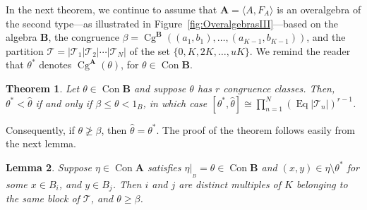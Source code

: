 \documentclass{au}
\numberwithin{equation}{section}
\theoremstyle{plain}
\newtheorem{theorem}{Theorem}[section]
\newtheorem{lemma}[theorem]{Lemma}
\theoremstyle{definition}
\newcommand{\<}{\ensuremath{\langle}}
\renewcommand{\>}{\ensuremath{\rangle}}
\newcommand{\bA}{\ensuremath{\mathbf{A}}}
\newcommand{\bB}{\ensuremath{\mathbf{B}}}
\newcommand{\sT}{\ensuremath{\mathscr{T}}}
\DeclareMathOperator{\Eq}{Eq}
\DeclareMathOperator{\Cg}{Cg}
\DeclareMathOperator{\Con}{Con}
\renewcommand{\leq}{\ensuremath{\leqslant}}
\renewcommand{\geq}{\ensuremath{\geqslant}}
\newcommand{\resB}{\ensuremath{|_{_B}}}
\begin{document}
In the next theorem, we continue to assume that $\bA = \< A, F_A\>$ is an
overalgebra of the second type---as illustrated in
Figure~\ref{fig:OveralgebrasIII}---based on the algebra $\bB$, the congruence
$\beta = \Cg^{\bB}((a_1, b_1), \dots, (a_{K-1},b_{K-1}))$, and the partition
$\sT = |\sT_1|\sT_2| \cdots |\sT_N|$ of the set  $\{0, K, 2K, \dots, uK\}$.
We remind the reader that $\theta^*$ denotes $\Cg^\bA(\theta)$, for
$\theta\in \Con \bB$.

\begin{theorem}
\label{thm3}
Let $\theta\in \Con \bB$ and suppose $\theta$ has $r$ congruence classes.
Then, $\theta^* < \widehat{\theta}$ if and only if
$\beta\leq \theta < 1_B$, in which case $[\theta^*, \widehat{\theta}] \cong
\prod_{n=1}^N(\Eq|\sT_n|)^{r-1}$.
\end{theorem}
Consequently, if $\theta \ngeq \beta$, then $\widehat{\theta} = \theta^*$.
The proof of the theorem follows easily from the next lemma.
\begin{lemma}
\label{lem3.1}
Suppose $\eta \in \Con\bA$ satisfies $\eta\resB = \theta \in \Con \bB$ and $(x,y) \in \eta \setminus \theta^*$ for some
$x\in B_{i}$,  and $y\in B_{j}$.  Then $i$ and $j$ are distinct multiples of $K$ belonging to the same
block of $\sT$, and $\theta \geq \beta$.
\end{lemma}
\end{document}
